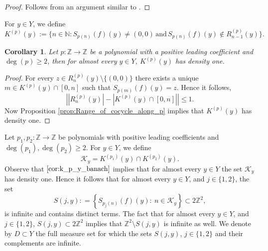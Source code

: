 \documentclass[12pt,reqno]{amsart}
\newcommand{\N}{\mathbb{N}}
\newcommand{\Z}{\mathbb{Z}}
\newtheorem{cor}[thm]{Corollary}
\theoremstyle{definition}
\begin{document}
\begin{proof} Follows from an argument similar to \cite[Proposition 4.4]{kosloff_Sanadhya_2024}. 
\end{proof}
For $y\in Y$, we define
\begin{equation}\label{eq:k_p_y}
K^{(p)}(y):= \{n\in\N : S_{p(n)}(f)(y) \neq (0,0) \,\mathrm{and}\,S_{p(n)}(f)(y) \notin R_{n-1}^{(p)}(y)\}.
\end{equation}
\begin{cor}\label{cor:k_p_y_banach} Let $p:\Z\to\Z$ be a polynomial with a positive leading coefficient and $\deg(p)\geq 2$, then for almost every $y \in Y$, $K^{(p)}(y)$ has density one.
\end{cor}
\begin{proof}
For every $z\in R_n^{(p)}(y)\setminus\{(0,0)\}$ there exists a unique $m\in K^{(p)}(y)\cap [0,n]$ such that $S_{p(m)}(f)(y) = z$. Hence it follows,  
\[
\left|\left|R_n^{(p)}(y)\right|-\left|K^{(p)}(y)\cap[0,n]\right|\right|\leq 1.
\]
Now Proposition \ref{prop:Range_of_cocycle_along_p} implies that $K^{(p)}(y)$ has density one. 
\end{proof} Let $p_1, p_2 : \Z \rightarrow \Z$ be polynomials with positive leading coefficients and $\deg(p_1), \deg(p_2) \geq 2$. For $y \in Y$, we define
\begin{equation}\label{eq:def_curly_K_y}
\mathcal{K}_y=K^{(p_1)}(y)\cap K^{(p_2)}(y).
\end{equation}
Observe that $\cref{cor:k_p_y_banach}$ implies that for almost every $y \in Y$ the set $\mathcal{K}_y$ has density one. Hence it follows that for almost every $y \in Y$, and $j\in \{1,2\}$, the set
\[
S(j,y) : = \left\{S_{p_j(n)}(f)(y):\ n\in \mathcal{K}_y\right\}\subset 2\Z^2,
\] is infinite and contains distinct terms. The fact that for almost every $y \in Y$, and $j\in \{1,2\}$, $S(j,y) \subset 2\Z^2$ implies that $\Z^2\setminus S(j,y)$ is infinite as well. We denote by $D \subset Y$ the full measure set for which the sets $S(j,y)$, $j \in \{1,2\}$ and their complements are infinite.
\end{document}
